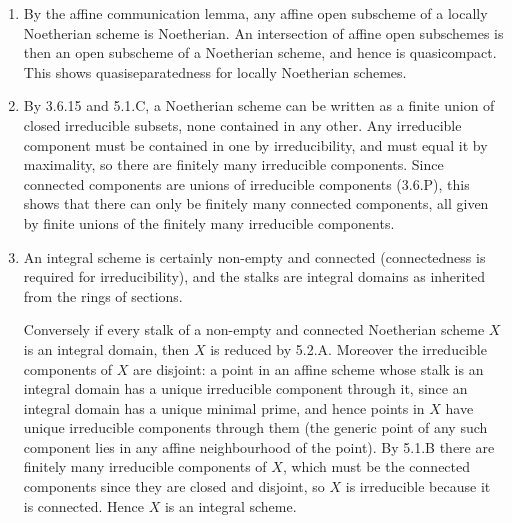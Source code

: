 \documentclass{report}
\begin{document}
\begin{enumerate}[label=\textbf{5.3.\Alph*.}]
	\item By the affine communication lemma, any affine open subscheme of a
	      locally Noetherian scheme is Noetherian. An intersection of affine open
	      subschemes is then an open subscheme of a Noetherian scheme, and hence
	      is quasicompact. This shows quasiseparatedness for locally Noetherian
	      schemes.

	\item By 3.6.15 and 5.1.C, a Noetherian scheme can be written as a finite
	      union of closed irreducible subsets, none contained in any other. Any
	      irreducible component must be contained in one by irreducibility, and
	      must equal it by maximality, so there are finitely many irreducible
	      components. Since connected components are unions of irreducible
	      components (3.6.P), this shows that there can only be finitely many
	      connected components, all given by finite unions of the finitely many
	      irreducible components.

	\item An integral scheme is certainly non-empty and connected (connectedness
	      is required for irreducibility), and the stalks are integral domains
	      as inherited from the rings of sections.

	      Conversely if every stalk of a non-empty and connected Noetherian
	      scheme $X$ is an integral domain, then $X$ is reduced by 5.2.A.
	      Moreover the irreducible components of $X$ are disjoint: a point in an
	      affine scheme whose stalk is an integral domain has a unique
	      irreducible component through it, since an integral domain has a unique
	      minimal prime, and hence points in $X$ have unique irreducible
	      components through them (the generic point of any such component lies
	      in any affine neighbourhood of the point). By 5.1.B there are finitely
	      many irreducible components of $X$, which must be the connected
	      components since they are closed and disjoint, so $X$ is irreducible
	      because it is connected. Hence $X$ is an integral scheme.


\end{enumerate}
\end{document}
